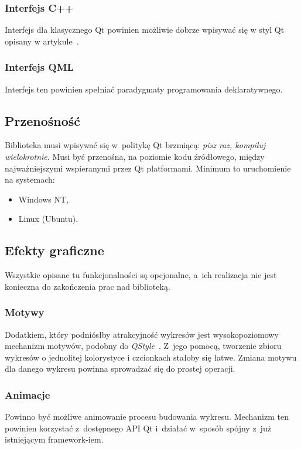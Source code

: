 \documentclass[11pt,twoside,a4paper,final]{article}
\begin{document}
\subsubsection{Interfejs C++}
Interfejs dla klasycznego Qt powinien możliwie dobrze wpisywać się w styl Qt opisany w artykule~\cite{qt-style-API}.

\subsubsection{Interfejs QML}
Interfejs ten powinien spełniać paradygmaty programowania deklaratywnego.

\subsection{Przenośność}
Biblioteka musi wpisywać się w~politykę Qt brzmiącą: \textit{pisz raz, kompiluj wielokrotnie}. Musi być przenośna, na poziomie kodu źródłowego, między najważniejszymi wspieranymi przez Qt platformami.
Minimum to uruchomienie na systemach:
\begin{itemize}
\item{Windows NT,}
\item{Linux (Ubuntu).}
\end{itemize}

\subsection{Efekty graficzne}
Wszystkie opisane tu funkcjonalności są opcjonalne, a~ich realizacja nie jest konieczna do zakończenia prac nad biblioteką.

\subsubsection{Motywy}
Dodatkiem, który podniósłby atrakcyjność wykresów jest wysokopoziomowy mechanizm motywów, podobny do \textit{QStyle}~\cite{qstyle}. Z~jego pomocą, tworzenie zbioru wykresów o jednolitej kolorystyce i czcionkach stałoby się łatwe. Zmiana motywu dla danego wykresu powinna sprowadzać się do prostej operacji.

\subsubsection{Animacje}
Powinno być możliwe animowanie procesu budowania wykresu. Mechanizm ten powinien korzystać z~dostępnego API Qt\cite{qt-anim} i~działać w~sposób spójny z~już istniejącym framework-iem.
\end{document}
